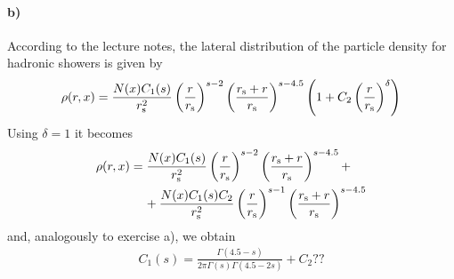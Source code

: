 \documentclass{article}
\begin{document}
\paragraph{b)}
According to the lecture notes, the lateral distribution of the particle density for hadronic showers is given by
\begin{align}
\rho(r,x)=\frac{N(x)C_1(s)}{r_{\rm s}^{2}}\left(\frac{r}{r_{\rm s}}\right)^{s-2}\left(\frac{r_{\rm s}+r}{r_{\rm s}}\right)^{s-4.5}\left(1+C_2\left(\frac{r}{r_{\rm s}}\right)^{\delta}\right)
\end{align}
Using $\delta=1$ it becomes
\begin{align}
\nonumber
\rho(r,x) & =\frac{N(x)C_1(s)}{r_{\rm s}^{2}}\left(\frac{r}{r_{\rm s}}\right)^{s-2}\left(\frac{r_{\rm s}+r}{r_{\rm s}}\right)^{s-4.5}+\\ &\hspace{0.4 cm}+\frac{N(x)C_1(s)C_2}{r_{\rm s}^{2}}\left(\frac{r}{r_{\rm s}}\right)^{s-1}\left(\frac{r_{\rm s}+r}{r_{\rm s}}\right)^{s-4.5}
\end{align}
and, analogously to exercise a), we obtain
\begin{align}
C_1(s)=\frac{\Gamma(4.5-s)}{2\pi \Gamma(s)\Gamma(4.5-2s)}+C_2??
\end{align} 
\end{document}
